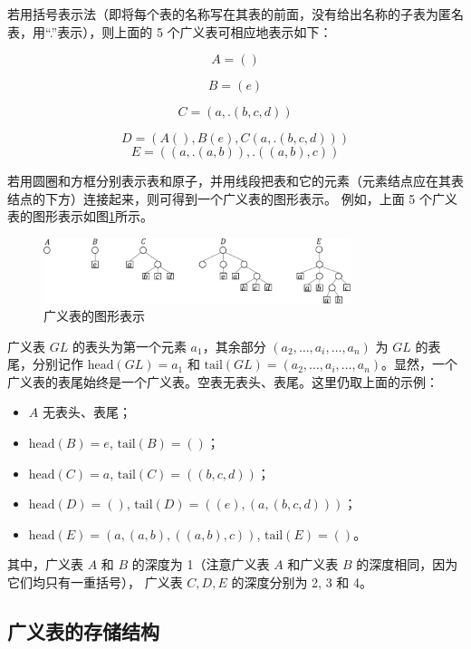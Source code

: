 \documentclass[lang=cn,newtx,10pt,scheme=chinese]{elegantbook}
\begin{document}
若用括号表示法（即将每个表的名称写在其表的前面，没有给出名称的子表为匿名表，用“.”表示），则上面的 5 个广义表可相应地表示如下：

\[
A = ()
\]

\[
  B = (e)
\]

\[
  C = (a, .(b, c, d))
\]

\[
D = (A(), B(e), C(a, .(b, c, d)))
\]
\[
E = ((a, .(a, b)), .((a, b), c))
\]

若用圆圈和方框分别表示表和原子，并用线段把表和它的元素（元素结点应在其表结点的下方）连接起来，则可得到一个广义表的图形表示。
例如，上面 5 个广义表的图形表示如图\ref{fig:generalized_table}所示。

\begin{figure}[h]
  \centering
  \includegraphics[width=0.8\textwidth]{./figure/pdf/cropped/GLGraph.pdf}
  \caption{广义表的图形表示}
  \label{fig:generalized_table}
\end{figure}

广义表 $GL$ 的表头为第一个元素 $a_1$，其余部分 $(a_2, \dots, a_i, \dots, a_n)$ 为 $GL$ 的表尾，分别记作 $\text{head}(GL) = a_1$ 和 $\text{tail}(GL) = (a_2, \dots, a_i, \dots, a_n)$。显然，一个广义表的表尾始终是一个广义表。空表无表头、表尾。这里仍取上面的示例：

\begin{itemize}
  \item $A$ 无表头、表尾；
  \item $\text{head}(B) = e$, $\text{tail}(B) = ()$；
  \item $\text{head}(C) = a$, $\text{tail}(C) = ((b, c, d))$；
  \item $\text{head}(D) = ()$, $\text{tail}(D) = ((e), (a, (b, c, d)))$；
  \item $\text{head}(E) = (a,(a,b),((a,b),c))$, $\text{tail}(E) = ()$。
\end{itemize}

其中，广义表 $A$ 和 $B$ 的深度为 1（注意广义表 $A$ 和广义表 $B$ 的深度相同，因为它们均只有一重括号），
广义表 $C, D, E$ 的深度分别为 2, 3 和 4。

\subsection{广义表的存储结构}
\end{document}
